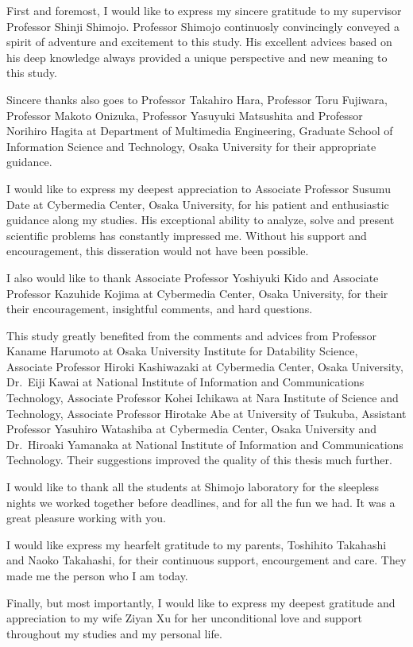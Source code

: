 
First and foremost, I would like to express my sincere gratitude to my
supervisor Professor Shinji Shimojo. Professor Shimojo continuosly
convincingly conveyed a spirit of adventure and excitement to this study. His
excellent advices based on his deep knowledge always provided a unique
perspective and new meaning to this study.

Sincere thanks also goes to Professor Takahiro Hara, Professor Toru Fujiwara,
Professor Makoto Onizuka, Professor Yasuyuki Matsushita and Professor Norihiro
Hagita at Department of Multimedia Engineering, Graduate School of Information
Science and Technology, Osaka University for their appropriate guidance.

I would like to express my deepest appreciation to Associate Professor Susumu
Date at Cybermedia Center, Osaka University, for his patient and enthusiastic
guidance along my studies. His exceptional ability to analyze, solve and
present scientific problems has constantly impressed me. Without his support
and encouragement, this disseration would not have been possible.

I also would like to thank Associate Professor Yoshiyuki Kido and Associate
Professor Kazuhide Kojima at Cybermedia Center, Osaka University, for their
their encouragement, insightful comments, and hard questions.

This study greatly benefited from the comments and advices from Professor
Kaname Harumoto at Osaka University Institute for Datability Science,
Associate Professor Hiroki Kashiwazaki at Cybermedia Center, Osaka University,
Dr.~Eiji Kawai at National Institute of Information and Communications
Technology, Associate Professor Kohei Ichikawa at Nara Institute of Science
and Technology, Associate Professor Hirotake Abe at University of Tsukuba,
Assistant Professor Yasuhiro Watashiba at Cybermedia Center, Osaka University
and Dr.~Hiroaki Yamanaka at National Institute of Information and
Communications Technology. Their suggestions improved the quality of this
thesis much further.

I would like to thank all the students at Shimojo laboratory for the sleepless
nights we worked together before deadlines, and for all the fun we had. It was
a great pleasure working with you.

I would like express my hearfelt gratitude to my parents, Toshihito Takahashi
and Naoko Takahashi, for their continuous support, encourgement and care. They
made me the person who I am today.

Finally, but most importantly, I would like to express my deepest gratitude
and appreciation to my wife Ziyan Xu for her unconditional love and support
throughout my studies and my personal life.
